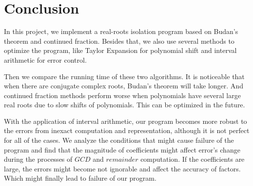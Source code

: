 \section{Conclusion} \label{conclusion}

In this project, we implement a real-roots isolation program based on
Budan’s theorem and continued fraction. Besides that, we also use several
methods to optimize the program, like Taylor Expansion for polynomial shift and
interval arithmetic for error control.

Then we compare the running time of these two algorithms. It is noticeable that
when there are conjugate complex roots, Budan’s theorem will take longer. And
continued fraction methods perform worse when polynomials have several large
real roots due to slow shifts of polynomials. This can be optimized in the
future.

With the application of interval arithmetic, our program becomes more robust to
the errors from inexact computation and representation, although it is not
perfect for all of the cases. We analyze the conditions that might
cause failure of the program and find that the magnitude of coefficients might
affect error's change during the processes of $GCD$ and $remainder$ computation.
If the coefficients are large, the errors might become not ignorable and affect
the accuracy of factors. Which might finally lead to failure of our program.
